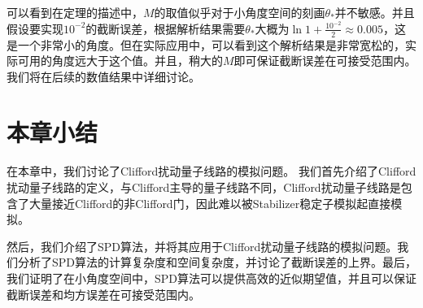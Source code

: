 可以看到在定理的描述中，$M$的取值似乎对于小角度空间的刻画$\theta_*$并不敏感。并且假设要实现$10^{-2}$的截断误差，根据解析结果需要$\theta_*$大概为$\ln 1+\frac{10^{-2}}{2} \approx 0.005$，这是一个非常小的角度。但在实际应用中，可以看到这个解析结果是非常宽松的，实际可用的角度远大于这个值。并且，稍大的$M$即可保证截断误差在可接受范围内。我们将在后续的数值结果中详细讨论。

\section{本章小结}
在本章中，我们讨论了Clifford扰动量子线路的模拟问题。
我们首先介绍了Clifford扰动量子线路的定义，与Clifford主导的量子线路不同，Clifford扰动量子线路是包含了大量接近Clifford的非Clifford门，因此难以被Stabilizer稳定子模拟起直接模拟。

然后，我们介绍了SPD算法，并将其应用于Clifford扰动量子线路的模拟问题。我们分析了SPD算法的计算复杂度和空间复杂度，并讨论了截断误差的上界。最后，我们证明了在小角度空间中，SPD算法可以提供高效的近似期望值，并且可以保证截断误差和均方误差在可接受范围内。